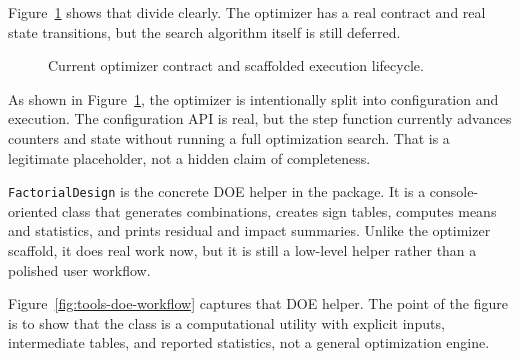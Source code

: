 Figure~\ref{fig:tools-optimizer-workflow} shows that divide clearly. The optimizer has a real contract and real state transitions, but the search algorithm itself is still deferred.

\begin{figure}[htbp]
\centering
{}
\caption{Current optimizer contract and scaffolded execution lifecycle.}
\label{fig:tools-optimizer-workflow}
\end{figure}

As shown in Figure~\ref{fig:tools-optimizer-workflow}, the optimizer is intentionally split into configuration and execution. The configuration API is real, but the step function currently advances counters and state without running a full optimization search. That is a legitimate placeholder, not a hidden claim of completeness.

\texttt{FactorialDesign} is the concrete DOE helper in the package. It is a console-oriented class that generates combinations, creates sign tables, computes means and statistics, and prints residual and impact summaries. Unlike the optimizer scaffold, it does real work now, but it is still a low-level helper rather than a polished user workflow.

Figure~\ref{fig:tools-doe-workflow} captures that DOE helper. The point of the figure is to show that the class is a computational utility with explicit inputs, intermediate tables, and reported statistics, not a general optimization engine.

